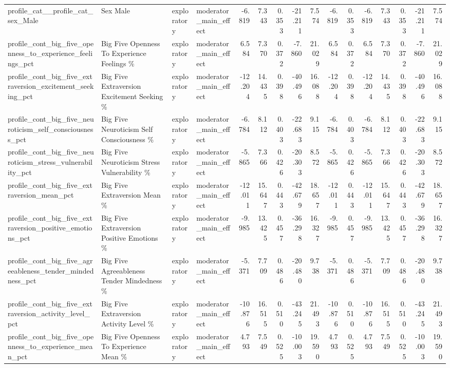 \begin{table}[htbp]
{{\begin{tabular}{llllrrrrrrrrrrrr}
profile\_cat\_\_profile\_cat\_sex\_Male & Sex Male & exploratory & moderator\_main\_effect & -6.819 & 7.343 & 0.353 & -21.211 & 7.574 & -6.819 & 0.353 & -6.819 & 7.343 & 0.353 & -21.211 & 7.574 \\
profile\_cont\_big\_five\_openness\_to\_experience\_feelings\_pct & Big Five Openness To Experience Feelings \% & exploratory & moderator\_main\_effect & 6.584 & 7.370 & 0.372 & -7.860 & 21.029 & 6.584 & 0.372 & 6.584 & 7.370 & 0.372 & -7.860 & 21.029 \\
profile\_cont\_big\_five\_extraversion\_excitement\_seeking\_pct & Big Five Extraversion Excitement Seeking \% & exploratory & moderator\_main\_effect & -12.204 & 14.435 & 0.398 & -40.496 & 16.088 & -12.204 & 0.398 & -12.204 & 14.435 & 0.398 & -40.496 & 16.088 \\
profile\_cont\_big\_five\_neuroticism\_self\_consciousness\_pct & Big Five Neuroticism Self Consciousness \% & exploratory & moderator\_main\_effect & -6.784 & 8.112 & 0.403 & -22.683 & 9.115 & -6.784 & 0.403 & -6.784 & 8.112 & 0.403 & -22.683 & 9.115 \\
profile\_cont\_big\_five\_neuroticism\_stress\_vulnerability\_pct & Big Five Neuroticism Stress Vulnerability \% & exploratory & moderator\_main\_effect & -5.865 & 7.366 & 0.426 & -20.303 & 8.572 & -5.865 & 0.426 & -5.865 & 7.366 & 0.426 & -20.303 & 8.572 \\
profile\_cont\_big\_five\_extraversion\_mean\_pct & Big Five Extraversion Mean \% & exploratory & moderator\_main\_effect & -12.011 & 15.647 & 0.443 & -42.679 & 18.657 & -12.011 & 0.443 & -12.011 & 15.647 & 0.443 & -42.679 & 18.657 \\
profile\_cont\_big\_five\_extraversion\_positive\_emotions\_pct & Big Five Extraversion Positive Emotions \% & exploratory & moderator\_main\_effect & -9.985 & 13.425 & 0.457 & -36.298 & 16.327 & -9.985 & 0.457 & -9.985 & 13.425 & 0.457 & -36.298 & 16.327 \\
profile\_cont\_big\_five\_agreeableness\_tender\_mindedness\_pct & Big Five Agreeableness Tender Mindedness \% & exploratory & moderator\_main\_effect & -5.371 & 7.709 & 0.486 & -20.480 & 9.738 & -5.371 & 0.486 & -5.371 & 7.709 & 0.486 & -20.480 & 9.738 \\
profile\_cont\_big\_five\_extraversion\_activity\_level\_pct & Big Five Extraversion Activity Level \% & exploratory & moderator\_main\_effect & -10.876 & 16.515 & 0.510 & -43.245 & 21.493 & -10.876 & 0.510 & -10.876 & 16.515 & 0.510 & -43.245 & 21.493 \\
profile\_cont\_big\_five\_openness\_to\_experience\_mean\_pct & Big Five Openness To Experience Mean \% & exploratory & moderator\_main\_effect & 4.793 & 7.549 & 0.525 & -10.003 & 19.590 & 4.793 & 0.525 & 4.793 & 7.549 & 0.525 & -10.003 & 19.590 \\

\end{tabular}}}
\end{table}

